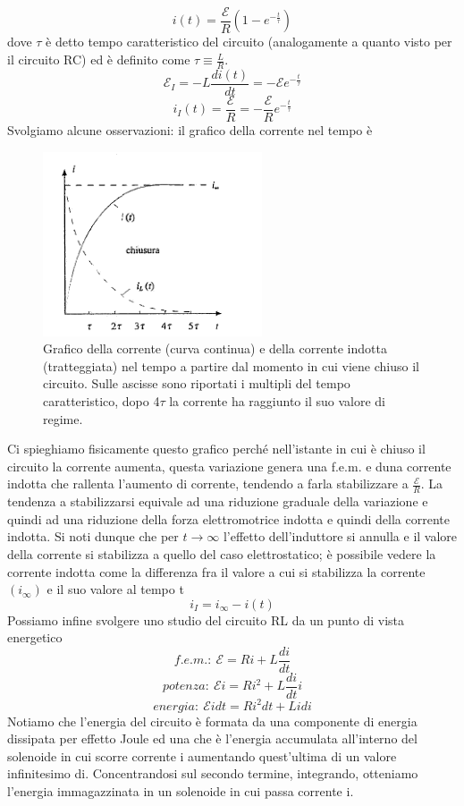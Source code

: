 \documentclass[
10pt, %
a4paper, %
oneside, %
headinclude,footinclude, %
BCOR5mm, %
]{scrartcl}
\begin{document}
\[i(t) = \frac{\mathcal{E}}{R}(1-e^{-\frac{t}{\tau}})\]
dove $\tau$ è detto tempo caratteristico del circuito (analogamente a quanto visto per il circuito RC) ed è definito come \(\tau \equiv \frac{L}{R}\).
\[\mathcal{E}_I = -L\frac{di(t)}{dt}=-\mathcal{E}e^{-\frac{t}{\tau}}\]
\[i_I(t) = \frac{\mathcal{E}}{R} = -\frac{\mathcal{E}}{R}e^{-\frac{t}{\tau}}\]
Svolgiamo alcune osservazioni: il grafico della corrente nel tempo è
\begin{figure}[h!]
	\centering
	\includegraphics[width=0.4\linewidth]{images/corrente_RL}
	\caption{Grafico della corrente (curva continua) e della corrente indotta (tratteggiata) nel tempo a partire dal momento in cui viene chiuso il circuito. Sulle ascisse sono riportati i multipli del tempo caratteristico, dopo 4\(\tau\) la corrente ha raggiunto il suo valore di regime.}
	\label{fig:correnterl}
\end{figure}
\FloatBarrier
Ci spieghiamo fisicamente questo grafico perché nell'istante in cui è chiuso il circuito la corrente aumenta, questa variazione genera una f.e.m. e duna corrente indotta che rallenta l'aumento di corrente, tendendo a farla stabilizzare a \(\frac{\mathcal{E}}{R}\). La tendenza a stabilizzarsi equivale ad una riduzione graduale della variazione e quindi ad una riduzione della forza elettromotrice indotta e quindi della corrente indotta. Si noti dunque che per \(t\to\infty\) l'effetto dell'induttore si annulla e il valore della corrente si stabilizza a quello del caso elettrostatico; è possibile vedere la corrente indotta come la differenza fra il valore a cui si stabilizza la corrente \((i_{\infty})\) e il suo valore al tempo t
\[i_I = i_\infty - i(t)\]
Possiamo infine svolgere uno studio del circuito RL da un punto di vista energetico
\[f.e.m.:\ \mathcal{E} = Ri+L\frac{di}{dt}\]
\[potenza:\ \mathcal{E}i = Ri^2+L\frac{di}{dt}i\]
\[energia:\  \mathcal{E}idt = Ri^2dt+Lidi\]
Notiamo che l'energia del circuito è formata da una componente di energia dissipata per effetto Joule ed una che è l'energia accumulata all'interno del solenoide in cui scorre corrente i aumentando quest'ultima di un valore infinitesimo di. Concentrandosi sul secondo termine, integrando, otteniamo l'energia immagazzinata in un solenoide in cui passa corrente i. 
\end{document}
